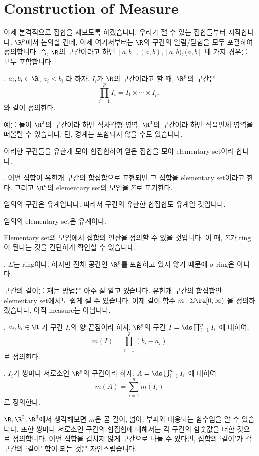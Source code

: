 \section*{Construction of Measure}

이제 본격적으로 집합을 재보도록 하겠습니다. 우리가 잴 수 있는 집합들부터 시작합니다. \(\R^p\)에서 논의할 건데, 이제 여기서부터는 \(\R\)의 구간의 열림/닫힘을 모두 포괄하여 정의합니다. 즉, \(\R\)의 구간이라고 하면 \([a, b], (a, b), [a, b), (a, b]\) 네 가지 경우를 모두 포함합니다.

.  \(a_i, b_i \in \R\), \(a_i \leq b_i\) 라 하자. \(I_i\)가 \(\R\)의 구간이라고 할 때, \(\R^p\)의 구간은
\[
    \prod_{i=1}^p I_i = I_1 \times \cdots \times I_p,
\]
와 같이 정의한다.

예를 들어 \(\R^2\)의 구간이라 하면 직사각형 영역, \(\R^3\)의 구간이라 하면 직육면체 영역을 떠올릴 수 있습니다. 단, 경계는 포함되지 않을 수도 있습니다.

이러한 구간들을 유한개 모아 합집합하여 얻은 집합을 모아 elementary set이라 합니다.

.  어떤 집합이 유한개 구간의 합집합으로 표현되면 그 집합을 elementary set이라고 한다. 그리고 \(\R^p\)의 elementary set의 모임을 \(\Sigma\)로 표기한다.

임의의 구간은 유계입니다. 따라서 구간의 유한한 합집합도 유계일 것입니다.

\rmk 임의의 elementary set은 유계이다.

Elementary set의 모임에서 집합의 연산을 정의할 수 있을 것입니다. 이 때, \(\Sigma\)가 ring이 된다는 것을 간단하게 확인할 수 있습니다.

\prop. \(\Sigma\)는 ring이다. 하지만 전체 공간인 \(\R^p\)를 포함하고 있지 않기 때문에 \(\sigma\)-ring은 아니다.

구간의 길이를 재는 방법은 아주 잘 알고 있습니다. 유한개 구간의 합집합인 elementary set에서도 쉽게 잴 수 있습니다. 이제 길이 함수 \(m: \Sigma \ra [0, \infty)\) 을 정의하겠습니다. 아직 measure는 아닙니다.

. \(a_i, b_i \in \R\) 가 구간 \(I_i\)의 양 끝점이라 하자. \(\R^p\)의 구간 \(I = \ds \prod_{i=1}^p I_i\) 에 대하여,
\[
    m(I) = \prod_{i=1}^p (b_i - a_i)
\]
로 정의한다.

. \(I_i\)가 쌍마다 서로소인 \(\R^p\)의 구간이라 하자. \(A = \ds\bigcup_{i=1}^n I_i\) 에 대하여
\[
    m(A) = \sum_{i=1}^n m(I_i)
\]
로 정의한다.

\(\R, \R^2, \R^3\)에서 생각해보면 \(m\)은 곧 길이, 넓이, 부피와 대응되는 함수임을 알 수 있습니다. 또한 쌍마다 서로소인 구간의 합집합에 대해서는 각 구간의 함숫값을 더한 것으로 정의합니다. 어떤 집합을 겹치지 않게 구간으로 나눌 수 있다면, 집합의 `길이'가 각 구간의 `길이' 합이 되는 것은 자연스럽습니다.

